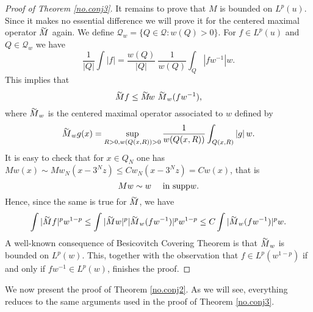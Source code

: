 \documentclass[11pt]{amsart}
\theoremstyle{definition}
\begin{document}
\begin{proof}[Proof of Theorem \ref{no.conj3}]
It remains to prove that $M$ is bounded on $L^p(u)$. Since it makes no essential difference we will prove it for the centered maximal operator ${\stackrel{\sim }{\smash{M}\rule{0pt}{1.1ex}}}$ again. We define $\mathcal Q_w=\{Q\in \mathcal Q: w(Q)>0\}$. For $f\in L^p(u)$ and $Q\in \mathcal Q_w$ we have
\[
\frac1{|Q|}\int |f| = \frac{w(Q)}{|Q|}\ \frac1{w(Q)}\int_Q |fw^{-1}|w.
\]
This implies that
\[
{\stackrel{\sim }{\smash{M}\rule{0pt}{1.1ex}}} f\leq {\stackrel{\sim }{\smash{M}\rule{0pt}{1.1ex}}}\!w\ {\stackrel{\sim }{\smash{M}\rule{0pt}{1.1ex}}}_w(fw^{-1}),
\]
where ${\stackrel{\sim }{\smash{M}\rule{0pt}{1.1ex}}}_w$ is the centered maximal operator associated to $w$ defined by
\[
{\stackrel{\sim }{\smash{M}\rule{0pt}{1.1ex}}}_w g(x)=\sup_{R>0,w(Q(x,R))>0} \frac1{w(Q(x,R))}\int_{Q(x,R)} |g|\,w.
\]
It is easy to check that for $x\in Q_N$ one has $Mw(x)\sim Mw_N(x-3^Nz)\leq C w_N(x-3^Nz)=Cw(x)$, that is 
\begin{equation}\label{a1.locala}
Mw\sim w\quad \mbox{ in } {\mathop{\mbox{\normalfont supp}}\nolimits} w.
\end{equation}
Hence, since the same is true for ${\stackrel{\sim }{\smash{M}\rule{0pt}{1.1ex}}}$, we have
\[
\int |{\stackrel{\sim }{\smash{M}\rule{0pt}{1.1ex}}} f|^p w^{1-p} \leq \int |{\stackrel{\sim }{\smash{M}\rule{0pt}{1.1ex}}} w|^p |{\stackrel{\sim }{\smash{M}\rule{0pt}{1.1ex}}}_w(fw^{-1})|^p w^{1-p}
\leq C \int |{\stackrel{\sim }{\smash{M}\rule{0pt}{1.1ex}}}_w(fw^{-1})|^p w.
\]
A well-known consequence of Besicovitch Covering Theorem is that ${\stackrel{\sim }{\smash{M}\rule{0pt}{1.1ex}}}_w$ is bounded on $L^p(w)$. This, together with the observation that $f\in L^p(w^{1-p})$ if and only if $fw^{-1}\in L^p(w)$, finishes the proof.

\end{proof}

\bigskip

We now present the proof of Theorem \ref{no.conj2}. As we will see, everything  reduces to the same arguments used in the proof of Theorem \ref{no.conj3}.

\bigskip
\end{document}
